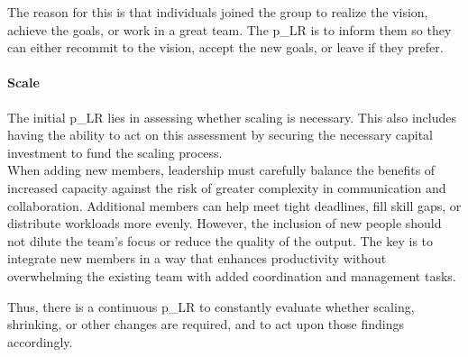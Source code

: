 The reason for this is that individuals joined the group to realize the vision, achieve the goals, or work in a great team. The \gls{p_LR} is to inform them so they can either recommit to the vision, accept the new goals, or leave if they prefer.

\paragraph{Scale}
The initial \gls{p_LR} lies in assessing whether scaling is necessary. This also includes having the ability to act on this assessment by securing the necessary capital investment to fund the scaling process.\\

When adding new members, leadership must carefully balance the benefits of increased capacity against the risk of greater complexity in communication and collaboration. Additional members can help meet tight deadlines, fill skill gaps, or distribute workloads more evenly. However, the inclusion of new people should not dilute the team's focus or reduce the quality of the output. The key is to integrate new members in a way that enhances productivity without overwhelming the existing team with added coordination and management tasks.

Thus, there is a continuous \gls{p_LR} to constantly evaluate whether scaling, shrinking, or other changes are required, and to act upon those findings accordingly.
